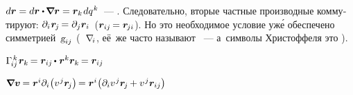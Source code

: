 \begin{otherlanguage}{russian}
 ${d\bm{r} = d\bm{r} \dotp \hspace{-0.2ex} \tikzmark{beginItsE} \boldnabla \bm{r} \tikzmark{endItsE} = \bm{r}_k \hspace{0.2ex} dq^{\hspace{.1ex}k}}$~--- . Следовательно, вторые частные производные коммутируют: ${\partial_i \hspace{.12ex} \bm{r}_{\hspace{-0.2ex}j} \hspace{-0.2ex} = \partial_j \bm{r}_i}$~(${\bm{r}_{ij} \hspace{-0.2ex} = \bm{r}_{\hspace{-0.2ex}ji}}$).
Но это необходимое условие уж\'{е} обеспечено симметрией~${\textsl{g}_{ij}}$ (~$\nabla_{\hspace{-0.32ex}i\hspace{.1ex}}$, её~же часто называют ~--- а~символы Христоффеля это  ).

${\Gamma_{\hspace{-0.25ex}ij}^{\hspace{.25ex}k} \hspace{.2ex} \bm{r}_k \hspace{-0.2ex} = \bm{r}_{ij} \hspace{-0.16ex} \dotp \hspace{.1ex} \bm{r}^k \bm{r}_k \hspace{-0.2ex} = \bm{r}_{ij}}$

$\bm{\nabla}\hspace{-0.2ex} \bm{v} \hspace{-0.16ex}
= \bm{r}^{i} \partial_i \hspace{-0.32ex} \left( v^{\hspace{.12ex}j} \bm{r}_{\hspace{-0.2ex}j} \right) \hspace{-0.25ex}
= \bm{r}^{i} \hspace{-0.32ex} \left( \partial_i v^{\hspace{.12ex}j} \bm{r}_{\hspace{-0.2ex}j} \hspace{-0.12ex} + v^{\hspace{.12ex}j} \bm{r}_{ij} \right)$


\end{otherlanguage}
